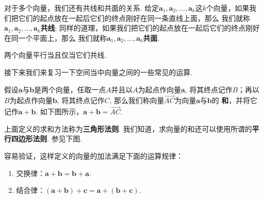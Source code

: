 \documentclass[a4paper, titlepage, twoside]{article}
\numberwithin{equation}{section}
\begin{document}
对于多个向量，我们还有共线和共面的关系.  给定$\pmb{a}_1, \pmb{a}_2, \ldots,
\pmb{a}_k$这$k$个向量，如果我们把它们的起点放在一起后它们的终点刚好在同一条直线上面，那么
我们就称$\pmb{a}_1, \pmb{a}_2, \ldots,
\pmb{a}_k${\bf 共线};
同样的道理，如果我们把它们的起点放在一起后它们的终点刚好在同一个平面上，那么
我们就称$\pmb{a}_1, \pmb{a}_2, \ldots,
\pmb{a}_k${\bf 共面}.

\begin{remark}
	两个向量平行当且仅当它们共线.
\end{remark}

接下来我们来复习一下空间当中向量之间的一些常见的运算. 


\begin{definition}
	假设$\pmb{a}$与$\pmb{b}$是两个向量，任取一点$A$并且以$A$为起点作向量$\pmb{a}$, 
	将其终点记作$B$；再以$B$为起点作向量$\pmb{b}$, 将其终点记作$C$,
	那么我们称向量$\overrightarrow{AC}$为向量$\pmb{a}$与$\pmb{b}$的{\bf
	和}，并将它记作$\pmb{a}+\pmb{b}$. 如下图所示，$\pmb{a}+\pmb{b}=
	\overrightarrow{AC}$. 
	\begin{center}
	\end{center}
\end{definition}

上面定义的求和方法称为{\bf 三角形法则}.
我们知道，求向量的和还可以使用所谓的{\bf 平行四边形法则}. 参见下图.

\begin{center}
\end{center}


容易验证，这样定义的向量的加法满足下面的运算规律：

\begin{enumerate}
	\item 交换律：$\pmb{a}+\pmb{b}=\pmb{b}+\pmb{a}$. 
	\item 结合律：$(\pmb{a}+\pmb{b}) + \pmb{c} = \pmb{a}+ (\pmb{b} +
		\pmb{c})$. 
\end{enumerate}
\end{document}
